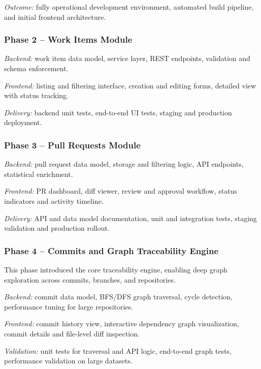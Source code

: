 \textit{Outcome:} fully operational development environment, automated build
pipeline, and initial frontend architecture.

\subsubsection{Phase 2 -- Work Items Module}

\textit{Backend:} work item data model, service layer, REST endpoints,
validation and schema enforcement.

\textit{Frontend:} listing and filtering interface, creation and editing forms,
detailed view with status tracking.

\textit{Delivery:} backend unit tests, end-to-end UI tests, staging and
production deployment.

\subsubsection{Phase 3 -- Pull Requests Module}

\textit{Backend:} pull request data model, storage and filtering logic, API
endpoints, statistical enrichment.

\textit{Frontend:} PR dashboard, diff viewer, review and approval workflow,
status indicators and activity timeline.

\textit{Delivery:} API and data model documentation, unit and integration
tests, staging validation and production rollout.

\subsubsection{Phase 4 -- Commits and Graph Traceability Engine}

This phase introduced the core traceability engine, enabling deep graph
exploration across commits, branches, and repositories.

\textit{Backend:} commit data model, BFS/DFS graph traversal, cycle detection,
performance tuning for large repositories.

\textit{Frontend:} commit history view, interactive dependency graph
visualization, commit details and file-level diff inspection.

\textit{Validation:} unit tests for traversal and API logic, end-to-end graph
tests, performance validation on large datasets.

